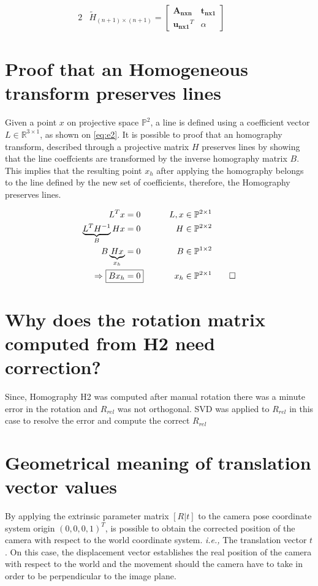 \documentclass{article}
\begin{document}
\begin{alignat}{2}
&\tilde{H}_{(n+1)\times(n+1)} = \begin{bmatrix}
\mathbf{A_{nxn}} & \mathbf{t_{nx1}} \\
\mathbf{u_{nx1}}^{T} & \alpha
\end{bmatrix} & \quad   \label{eq:e1}
\end{alignat}


\section{Proof that an Homogeneous transform preserves lines}
Given a point $x$ on projective space $\mathbb{P}^2$, a line is defined using a coefficient vector $L \in \mathbb{R}^{3 \times 1}$, as shown on \eqref{eq:e2}. It is possible to proof that an homography transform, described through a projective matrix $H$ preserves lines by showing that the line coeffcients are transformed by the inverse homography matrix $B$. This implies that the resulting point $x_{h}$ after applying the homography belongs to the line defined by the new set of coefficients, therefore, the Homography preserves lines.

\begin{alignat}{3}
L^{T}x &= 0 \qquad &L, x &\in \mathbb{P}^{2 \times 1} \label{eq:e2} \\
\nonumber
\underbrace{L^{T}H^{-1}}_{B}Hx &= 0 \qquad &H &\in \mathbb{P}^{2 \times 2} \\
\nonumber
B\underbrace{Hx}_{x_h} &= 0 \qquad &B &\in \mathbb{P}^{1 \times 2} \\
\Rightarrow~ \Aboxed{Bx_h &= 0} \qquad &x_h &\in \mathbb{P}^{2 \times 1} \qed \label{eq:e3}
\end{alignat}

\section{Why does the rotation matrix computed from H2 need correction?}
Since, Homography H2 was computed after manual rotation there was a minute error in the rotation and $R_{rel}$ was not orthogonal. SVD was applied to $R_{rel}$ in this case to resolve the error and compute the correct $R_{rel}$

\section{Geometrical meaning of translation vector values}
By applying the extrinsic parameter matrix $[R | t]$ to the camera pose coordinate system origin $(0, 0, 0, 1)^T$, is possible to obtain the corrected position of the camera with respect to the world coordinate system. \textit{i.e.,} The translation vector $t$. On this case, the displacement vector establishes the real position of the camera with respect to the world and the movement should the camera have to take in order to be perpendicular to the image plane.
\end{document}
